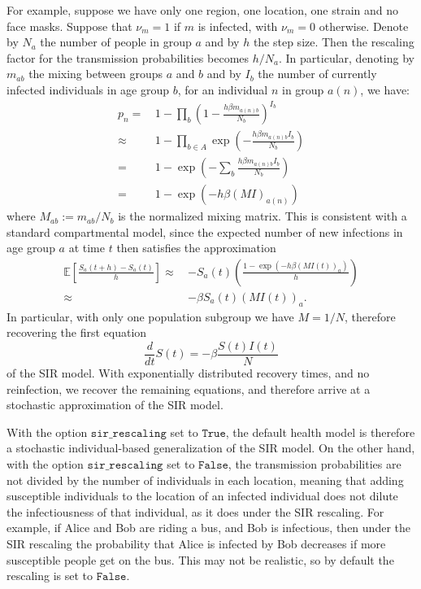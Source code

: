 \documentclass[10pt,letterpaper]{article}
\begin{document}
For example, suppose we have only one region, one location, one strain and no face masks. Suppose that $\nu_m = 1$ if $m$ is infected, with $\nu_m = 0$ otherwise. Denote by $N_{a}$ the number of people in group $a$ and by $h$ the step size. Then the rescaling factor for the transmission probabilities becomes $h / N_a$. In particular, denoting by $m_{ab}$ the mixing between groups $a$ and $b$ and by $I_b$ the number of currently infected individuals in age group $b$, for an individual $n$ in group $a(n)$, we have:
\begin{align} \nonumber
p_n =\, & 1 - \prod_{b} \left(1 - \frac{h \beta m_{a(n) b}}{N_b}\right)^{I_b} \\ \nonumber
\approx\, & 1 - \prod_{b \in A} \exp \left(-\frac{h\beta m_{a(n)b} I_b}{N_b}\right)\\ \nonumber
 = \, & 1 - \exp \left(- \sum_{b} \frac{h\beta m_{a(n)b} I_b}{N_b}\right)\\[2mm] \nonumber
 = \, & 1 - \exp \left(- h\beta (MI)_{a(n)}\right) \nonumber
\end{align}
where $M_{ab} := m_{ab} / N_b$ is the normalized mixing matrix. This is consistent with a standard compartmental model, since the expected number of new infections in age group $a$ at time $t$ then satisfies the approximation
\begin{align} \nonumber
\mathbb{E}\left[\frac{S_a(t+h) - S_a(t)}{h}\right] \approx\, & -S_a(t)\left(\frac{1 - \exp \left(- h\beta (MI(t))_{a}\right)}{h}\right)\\[2mm] \nonumber
\approx\, & -\beta S_a(t) (MI(t))_a. \nonumber
\end{align}
In particular, with only one population subgroup we have $M = 1 / N$, therefore recovering the first equation
\begin{equation*}
\frac{d}{dt} S(t) = - \beta \frac{S(t)I(t)}{N}
\end{equation*}
of the SIR model. With exponentially distributed recovery times, and no reinfection, we recover the remaining equations, and therefore arrive at a stochastic approximation of the SIR model.

With the option $\texttt{sir{\_}rescaling}$ set to $\texttt{True}$, the default health model is therefore a stochastic individual-based generalization of the SIR model. On the other hand, with the option $\texttt{sir{\_}rescaling}$ set to $\texttt{False}$, the transmission probabilities are not divided by the number of individuals in each location, meaning that adding susceptible individuals to the location of an infected individual does not dilute the infectiousness of that individual, as it does under the SIR rescaling. For example, if Alice and Bob are riding a bus, and Bob is infectious, then under the SIR rescaling the probability that Alice is infected by Bob decreases if more susceptible people get on the bus. This may not be realistic, so by default the rescaling is set to $\texttt{False}$.
\end{document}
